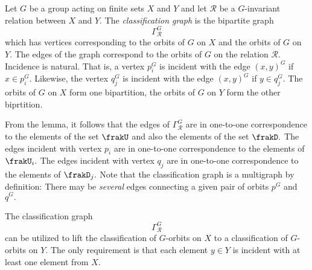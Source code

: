 \begin{definition}\label{def-orbitgraph}
Let $G$ be a group acting on finite sets $X$ and $Y$ and 
let ${\mathcal R}$ be a $G$-invariant relation between $X$ and $Y.$ 
The {\em classification graph} is the bipartite graph
\begin{equation}\label{def:graph}
\Gamma_{\mathcal R}^G
\end{equation}
which has vertices corresponding to the orbits of $G$ on $X$ and the orbits of $G$ on $Y$.
The edges of the graph correspond to the orbits of $G$ on the relation ${\mathcal R}.$ 
Incidence is natural. That is, a vertex $p_i^G$ is incident with the edge $(x,y)^G$ 
if $x \in p_i^G$. Likewise, the vertex $q_j^G$ is incident with the edge $(x,y)^G$ if 
$y \in q_j^G.$
The orbits of $G$ on $X$ form one bipartition, the orbits of $G$ on $Y$ form the other biprtition.
\end{definition}

From the lemma, it follows that the edges of $\Gamma_{\mathcal R}^G$ are in one-to-one correspondence to 
the elements of the set $\frakU$ and also the elements of the set $\frakD.$
The edges incident with vertex $p_i$ are in one-to-one correspondence to the elements of $\frakU_i.$ 
The edges incident with vertex $q_j$ are in one-to-one correspondence to the elements of $\frakD_j.$
Note that the classification graph is a multigraph by definition: 
There may be {\em several} edges connecting a given pair of orbits $p^G$ and $q^G.$ 


\bigskip






The classification graph 
$$
\Gamma_{\mathcal R}^G
$$
can be utilized to lift the classification of $G$-orbits on $X$ to a classification of $G$-orbits on $Y$.
The only requirement is that each element $y \in Y$ 
is incident with at least one element from $X$. 

